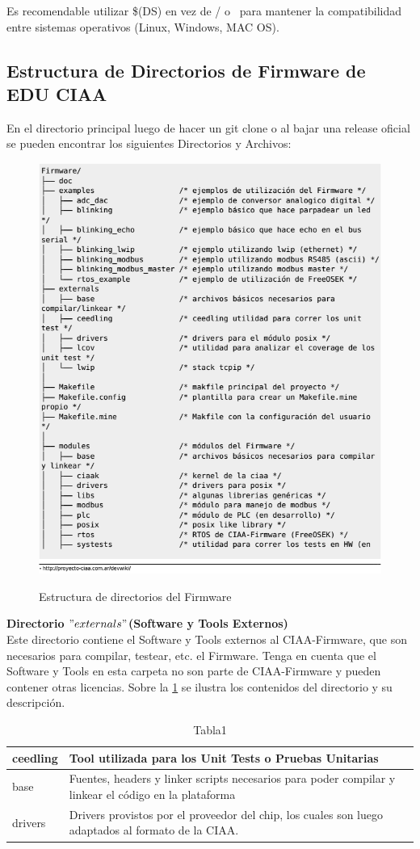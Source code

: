 \documentclass[12pt,letterpaper]{article}
\begin{document}
Es recomendable utilizar \$(DS) en vez de / o \ para mantener la compatibilidad entre sistemas operativos (Linux, Windows, MAC OS).
{
\subsection{Estructura de Directorios de Firmware de EDU CIAA}
En el directorio principal luego de hacer un git clone o al bajar una release oficial se pueden encontrar los siguientes Directorios y Archivos:


\begin{figure}[!h]
\centering
\includegraphics[width=8 cm]{figuras/est_directorios_ciaa.png}\\
\caption{Estructura de directorios del Firmware}
\label{Fig3}
\end{figure}

\textbf{Directorio $"externals"$(Software y Tools Externos)}\\
Este directorio contiene el Software y Tools externos al CIAA-Firmware, que son necesarios para compilar, testear, etc. el Firmware. Tenga en cuenta que el Software y Tools en esta carpeta no son parte de CIAA-Firmware y pueden contener otras licencias. Sobre la \ref{Tab1} se ilustra los contenidos del directorio y su descripción.

\begin{table}
\begin{center}
\begin{tabular}{|l|l|}
\hline\hline
ceedling & Tool utilizada para los Unit Tests o Pruebas Unitarias\\ \hline
base & Fuentes, headers y linker scripts necesarios para poder compilar y linkear el código en la plataforma\\ \hline
drivers & Drivers provistos por el proveedor del chip, los cuales son luego adaptados al formato de la CIAA.\\ \hline
\end{tabular}
\caption{Tabla1}
\label{Tab1}
\end{center}
\end{table}

}
\end{document}
